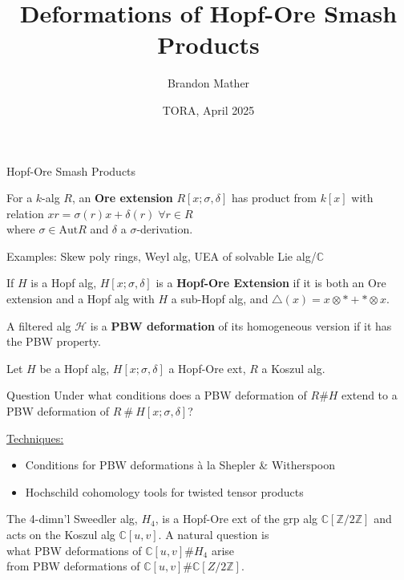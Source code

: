 \documentclass{beamer}
\title{Deformations of Hopf-Ore Smash Products}
\author{Brandon Mather}
\date{TORA, April 2025}
\begin{document}
\maketitle

\begin{frame}{Hopf-Ore Smash Products}
\begin{definition}
    For a \(k\)-alg \(R\), an \textbf{Ore extension} \(R[x;\sigma,\delta]\) has product from \(k[x]\) with relation \(xr=\sigma(r)x+\delta(r)\;\forall r\in R\) \\where \(\sigma\in \text{Aut}R\) and \(\delta\) a \(\sigma\)-derivation. 
\end{definition}
Examples: Skew poly rings, Weyl alg, UEA of solvable Lie alg/\(\mathbb{C}\)
\begin{definition}
    If \(H\) is a Hopf alg, \(H[x;\sigma,\delta]\) is a \textbf{Hopf-Ore Extension} if it is both an Ore extension and a Hopf alg with \(H\) a sub-Hopf alg, and \(\triangle(x)=x\otimes *+*\otimes x\).
\end{definition}
\begin{definition}
    A filtered alg \(\mathcal{H}\) is a \textbf{PBW deformation} of its homogeneous version if it has the PBW property.
\end{definition}
\end{frame}

\begin{frame} 
    Let \(H\) be a Hopf alg, \(H[x;\sigma,\delta]\) a Hopf-Ore ext, \(R\) a Koszul alg.
\begin{beamerboxesrounded}{Question}
    Under what conditions does a PBW deformation of \(R\#H\) extend to a PBW deformation of \(R\ \#\ H[x;\sigma,\delta]\)?
\end{beamerboxesrounded}

\underline{Techniques:}
\begin{itemize}
    \item Conditions for PBW deformations \`a la Shepler \& Witherspoon
    \item Hochschild cohomology tools for twisted tensor products
\end{itemize}
\begin{example}
   The 4-dimn'l Sweedler alg, \(H_4\), is a  Hopf-Ore ext of the grp alg \(\mathbb{C}[\mathbb{Z}/2\mathbb{Z}]\) and acts on the Koszul alg \(\mathbb{C}[u,v]\).
   A natural question is \\what PBW deformations of \(\mathbb{C}[u,v]\#H_4\) arise \\ from PBW deformations of \(\mathbb{C}[u,v]\#\mathbb{C}[Z/2\mathbb{Z}]\).
\end{example}
\end{frame}
\end{document}
